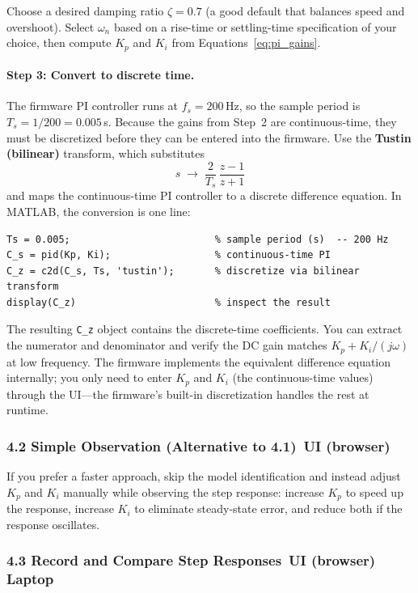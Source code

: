 \documentclass{ol-softwaremanual}
\newcommand{\onlaptop}{%
  \,\colorbox{green!25}{\footnotesize\sffamily\bfseries Laptop}}
\newcommand{\onui}{%
  \,\colorbox{yellow!50}{\footnotesize\sffamily\bfseries UI (browser)}}
\begin{document}
Choose a desired damping ratio $\zeta = 0.7$ (a good default that balances speed and
overshoot).
Select $\omega_n$ based on a rise-time or settling-time specification of your choice,
then compute $K_p$ and $K_i$ from Equations~\eqref{eq:pi_gains}.

\paragraph{Step 3: Convert to discrete time.}
The firmware PI controller runs at $f_s = 200$\,Hz, so the sample period is
$T_s = 1/200 = 0.005$\,s.
Because the gains from Step~2 are continuous-time, they must be discretized before
they can be entered into the firmware.
Use the \textbf{Tustin (bilinear)} transform, which substitutes
\[
  s \;\longrightarrow\; \frac{2}{T_s}\,\frac{z-1}{z+1}
\]
and maps the continuous-time PI controller to a discrete difference equation.
In MATLAB, the conversion is one line:

\begin{verbatim}
Ts = 0.005;                         % sample period (s)  -- 200 Hz
C_s = pid(Kp, Ki);                  % continuous-time PI
C_z = c2d(C_s, Ts, 'tustin');       % discretize via bilinear transform
display(C_z)                        % inspect the result
\end{verbatim}

The resulting \texttt{C\_z} object contains the discrete-time coefficients.
You can extract the numerator and denominator and verify the DC gain matches
$K_p + K_i / (j\omega)$ at low frequency.
The firmware implements the equivalent difference equation internally;
you only need to enter $K_p$ and $K_i$ (the continuous-time values) through
the UI---the firmware's built-in discretization handles the rest at runtime.

\subsubsection*{4.2 Simple Observation (Alternative to 4.1)\onui}

If you prefer a faster approach, skip the model identification and instead adjust
$K_p$ and $K_i$ manually while observing the step response:
increase $K_p$ to speed up the response, increase $K_i$ to eliminate steady-state
error, and reduce both if the response oscillates.

\subsubsection*{4.3 Record and Compare Step Responses\onui\onlaptop}
\end{document}
